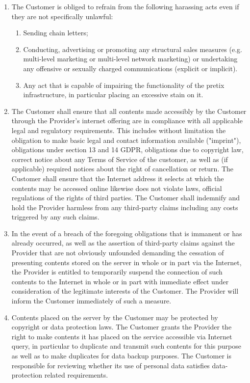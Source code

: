 \documentclass{terms}
\begin{document}
\begin{enumerate}
\item The Customer is obliged to refrain from the following harassing acts even if they are not specifically unlawful:\begin{enumerate}
\item Sending chain letters;
\item Conducting, advertising or promoting any structural sales measures (e.g. multi-level marketing or multi-level network marketing) or undertaking any offensive or sexually charged communications (explicit or implicit).
\item Any act that is capable of impairing the functionality of the pretix infrastructure, in particular placing an excessive stain on it.
\end{enumerate}
\item The Customer shall ensure that all contents made accessibly by the Customer through the Provider's internet offering are in compliance with all applicable legal and regulatory requirements. This includes without limitation the obligation to make basic legal and contact information available ("imprint"), obligations under section 13 and 14 GDPR, obligations due to copyright law, correct notice about any Terms of Service of the customer, as well as (if applicable) required notices about the right of cancellation or return. The Customer shall ensure that the Internet address it selects at which the contents may be accessed online likewise does not violate laws, official regulations of the rights of third parties. The Customer shall indemnify and hold the Provider harmless from any third-party claims including any costs triggered by any such claims.
\item In the event of a breach of the foregoing obligations that is immanent or has already occurred, as well as the assertion of third-party claims against the Provider that are not obviously unfounded demanding the cessation of presenting contents stored on the server in whole or in part via the Internet, the Provider is entitled to temporarily suspend the connection of such contents to the Internet in whole or in part with immediate effect under consideration of the legitimate interests of the Customer. The Provider will inform the Customer immediately of such a measure.
\item Contents placed on the server by the Customer may be protected by copyright or data protection laws. The Customer grants the Provider the right to make contents it has placed on the service accessible via Internet query, in particular to duplicate and transmit such contents for this purpose as well as to make duplicates for data backup purposes. The Customer is responsible for reviewing whether its use of personal data satisfies data-protection related requirements.

\end{enumerate}
\end{document}

